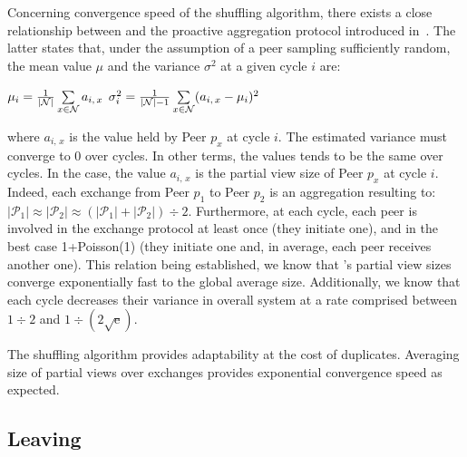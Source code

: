 Concerning convergence speed of the shuffling algorithm, there exists
a close relationship between \SPRAY{} and the proactive aggregation
protocol introduced
in~\cite{jelasity2004epidemic,montresor2004robust}. The latter states
that, under the assumption of a peer sampling sufficiently random, the
mean value $\mu$ and the variance $\sigma^2$ at a given cycle $i$ are:
\begin{center}
  $\mu_i = {1\over{|\mathcal{N}|}} \sum\limits_{x \in \mathcal{N}} a_{i,\,x}$
  \hfill
  $\sigma^2_i = {1\over{|\mathcal{N}|-1}}\sum\limits_{x \in \mathcal{N}}
  (a_{i,\,x} - \mu_i)^2$
\end{center}
where $a_{i,\,x}$ is the value held by Peer $p_x$ at cycle $i$. The estimated
variance must converge to $0$ over cycles. In other terms, the values tends to
be the same over cycles. In the \SPRAY{} case, the value $a_{i,\,x}$ is the
partial view size of Peer $p_x$ at cycle $i$. Indeed, each exchange from Peer
$p_1$ to Peer $p_2$ is an aggregation resulting to:
$|\mathcal{P}_1|\approx|\mathcal{P}_2|\approx{(|\mathcal{P}_1| +
  |\mathcal{P}_2|) \div 2}$.
Furthermore, at each cycle, each peer is involved in the exchange protocol at
least once (they initiate one), and in the best case 1+Poisson(1) (they
initiate one and, in average, each peer receives another one). This relation
being established, we know that \SPRAY{}'s partial view sizes converge
exponentially fast to the global average size. Additionally, we know that each
cycle decreases their variance in overall system at a rate comprised between
${1\div 2}$ and $1\div ({2\sqrt{\text{e}}})$.

The shuffling algorithm provides adaptability at the cost of
duplicates. Averaging size of partial views over exchanges provides
exponential convergence speed as expected.

\subsection{Leaving}
\label{subsec:leaving}

